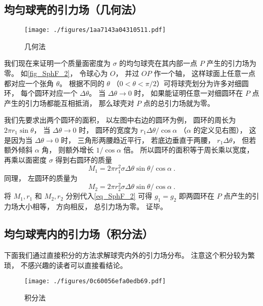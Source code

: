 \subsection{均匀球壳的引力场（几何法）}\label{sub_SphF_1}

\begin{figure}[ht]
\centering
\texttt{[image: ./figures/1aa7143a04310511.pdf]}
\caption{几何法} \label{fig_SphF_2}
\end{figure}

我们现在来证明一个质量面密度为 $\sigma$ 的均匀球壳在其内部一点 $P$ 产生的引力场为零。 如\autoref{fig_SphF_2}， 令球心为 $O$， 并过 $OP$ 作一个轴， 这样球面上任意一点都对应一个张角 $\theta$。 根据不同的 $\theta$ （$0 < \theta < \pi/2$）可将球壳划分为许多对细圆环， 每个圆环对应一个 $\Delta\theta$。 当 $\Delta\theta\to 0$ 时， 如果能证明任意一对细圆环在 $P$ 点产生的引力场都能互相抵消， 那么球壳对 $P$ 点的总引力场就为零。

我们先要求出两个圆环的面积， 以左图中右边的圆环为例， 圆环的周长为 $2\pi r_1\sin\theta$， 当 $\Delta\theta\to 0$ 时， 圆环的宽度为 $r_1\Delta\theta/\cos\alpha$ （$\alpha$ 的定义见右图）， 这是因为当 $\Delta \theta \to 0$ 时， 三角形两腰趋近平行， 若底边垂直于两腰，  $r_1\Delta\theta$， 但若额外倾斜 $\alpha$ 角， 则额外增长 $1/\cos\alpha$ 倍。 所以圆环的面积等于周长乘以宽度， 再乘以面密度 $\sigma$ 得到右圆环的质量
\begin{equation}
M_1 = 2\pi r_1^2 \sigma \Delta\theta\sin\theta /\cos\alpha~.
\end{equation}
同理， 左圆环的质量为
\begin{equation}
M_2 = 2\pi r_2^2 \sigma \Delta\theta\sin\theta /\cos\alpha~.
\end{equation}
将 $M_1, r_1$ 和 $M_2, r_2$ 分别代入\autoref{eq_SphF_2} 可得 $g_1 = g_2$ 即两圆环在 $P$ 点产生的引力场大小相等， 方向相反， 总引力场为零。 证毕。

\subsection{均匀球壳内的引力场（积分法）}
下面我们通过直接积分的方法求解球壳内外的引力场分布。 注意这个积分较为繁琐， 不感兴趣的读者可以直接看结论。

\begin{figure}[ht]
\centering
\texttt{[image: ./figures/0c60056efa0edb69.pdf]}
\caption{积分法} \label{fig_SphF_3}
\end{figure}

